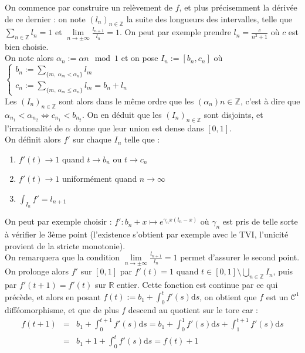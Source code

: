 \documentclass[11pt,a4paper]{article}
\begin{document}
On commence par construire un relèvement de $f$, et plus précisemment la dérivée de ce dernier : on note $(l_n)_{n\in \mathbb{Z}}$ la suite des longueurs des intervalles, telle que $\displaystyle \sum_{n\in \mathbb{Z}} l_n = 1$ et $\displaystyle \lim\limits_{n \to \pm \infty } \frac{l_{n+1}}{l_n} = 1 $. On peut par exemple prendre $l_n = \displaystyle \frac{c}{n^2 + 1}$ où $c$ est bien choisie. \\
On note alors $ \alpha_n := \alpha n \mod 1$ et on pose $I_n := [b_n , c_n]$ où $\begin{cases} b_n := \displaystyle \sum_{\{m, \ \alpha_m < \alpha_n\}} l_m \\ c_n := \displaystyle \sum_{\{m, \ \alpha_m \leq \alpha_n\}} l_m  = b_n + l_n \end{cases}$ \\

Les $(I_n)_{n\in \mathbb{Z}}$ sont alors dans le même ordre que les $(\alpha_n){n\in \mathbb{Z}}$, c'est à dire que $\alpha_{n_1} < \alpha_{n_2} \Leftrightarrow c_{n_1} < b_{n_2}$. On en déduit que les $(I_n)_{n\in \mathbb{Z}}$ sont disjoints, et l'irrationalité de $\alpha$ donne que leur union est dense dans $[0, 1]$. \\

On définit alors $f'$ sur chaque $I_n$ telle que : 
\begin{enumerate}
\item $f'(t) \to 1$ quand $t\to b_n$ ou $t\to c_n$
\item $f'(t) \to 1$ uniformément quand $n\to \infty$
\item $\displaystyle \int_{I_n}f'=l_{n+1}$
\end{enumerate}

On peut par exemple choisir : $f': b_n + x \mapsto \displaystyle e^{\gamma_n x (l_n -x)} $ où $\gamma_n$ est pris de telle sorte à vérifier le 3ème point (l'existence s'obtient par exemple avec le TVI, l'unicité provient de la stricte monotonie). \\ 
On remarquera que la condition $\displaystyle \lim\limits_{n \to \pm \infty } \frac{l_{n+1}}{l_n} = 1 $ permet d'assurer le second point. \\

On prolonge alors $f'$ sur $[0,1]$ par $f'(t)=1$ quand $\displaystyle t\in [0,1] \setminus \bigcup_{n\in \mathbb{Z}} I_n$, puis par $f'(t+1)=f'(t)$ sur $\mathbb{R}$ entier. Cette fonction est continue par ce qui précède, et alors en posant $f(t) := b_1 + \displaystyle \int_0^t f'(s) \mathrm{d}s$, on obtient que $f$ est un $\mathcal{C}^1$ difféomorphisme, et que de plus $f$ descend au quotient sur le tore car : \\
\begin{eqnarray*}
f(t+1) &=& b_1 +  \int_0^{t+1} f'(s) \mathrm{d}s = b_1 + \int_0^1 f'(s) \mathrm{d}s + \int_1^{t+1} f'(s) \mathrm{d}s \\
&=& b_1 + 1 + \int_0^t f'(s) \mathrm{d}s = f(t) + 1
\end{eqnarray*}
\end{document}
